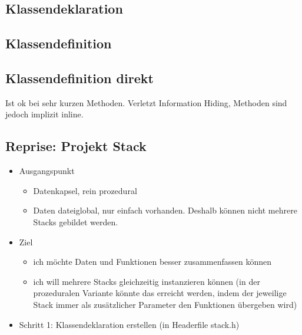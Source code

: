\subsection{Klassendeklaration}
\label{sec:Klassendeklaration}
\noindent
\begin{minipage}{\linewidth}
	
\end{minipage}

\subsection{Klassendefinition}
\label{sec:Klassendefinition}
\noindent
\begin{minipage}{\linewidth}
	
\end{minipage}

\subsection{Klassendefinition direkt}
\label{sec:Klassendefinition direkt}
\noindent
\begin{minipage}{\linewidth}
	
\end{minipage}
\begin{hinweis}
	Ist ok bei sehr kurzen Methoden. Verletzt Information Hiding, Methoden sind jedoch implizit inline.
\end{hinweis}

\subsection{Reprise: Projekt Stack}
\label{sec:Reprise: Projekt Stack}
\begin{itemize}
	\item Ausgangspunkt
	\begin{itemize}
		\item Datenkapsel, rein prozedural
		\item Daten dateiglobal, nur einfach vorhanden. Deshalb können nicht mehrere Stacks gebildet werden.
	\end{itemize}
	\item Ziel
	\begin{itemize}
		\item ich möchte Daten und Funktionen besser zusammenfassen können
		\item ich will mehrere Stacks gleichzeitig instanzieren können (in der prozeduralen Variante könnte das erreicht werden, indem der jeweilige Stack immer als zusätzlicher Parameter den Funktionen übergeben wird)
	\end{itemize}
	\item Schritt 1: Klassendeklaration erstellen (in Headerfile stack.h)
\end{itemize}

